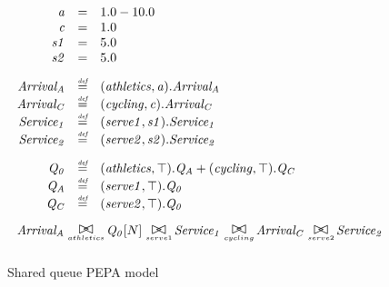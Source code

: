 \documentclass[runningheads]{llncs}
\begin{document}
\begin{figure}
	\centering
	\begin{displaymath}
	\begin{array}{rcl}
	\mathit{a} & = & 1.0-10.0\\
	\mathit{c} & = & 1.0\\
	\mathit{s1} & = & 5.0\\
	\mathit{s2} & = & 5.0\\
	[2.0ex]		\mathit{Arrival_A} & \rmdef & (\mathit{athletics},\mathit{a}).\mathit{Arrival_A}\\
	\mathit{Arrival_C} & \rmdef & (\mathit{cycling},\mathit{c}).\mathit{Arrival_C}\\
	\mathit{Service_1} & \rmdef & (\mathit{serve1},\mathit{s1}).\mathit{Service_1}\\
	\mathit{Service_2} & \rmdef & (\mathit{serve2},\mathit{s2}).\mathit{Service_2}\\
	[2.0ex]		\mathit{Q_0} & \rmdef & (\mathit{athletics},\top).\mathit{Q_A}+(\mathit{cycling},\top).\mathit{Q_C}\\
	\mathit{Q_A} & \rmdef & (\mathit{serve1},\top).\mathit{Q_0}\\
	\mathit{Q_C} & \rmdef & (\mathit{serve2},\top).\mathit{Q_0}\\
	[2.0ex]		\multicolumn{3}{l}{\mathit{Arrival_A}\sync{athletics}\mathit{Q_0}[N]\sync{serve1}\mathit{Service_1}\sync{cycling}\mathit{Arrival_C}\sync{serve2}\mathit{Service_2}}\\
	[2.0ex]	\end{array}
	\end{displaymath}
	\caption{Shared queue PEPA model}
	\label{figure:pepa_queue_model}
\end{figure}
\end{document}
